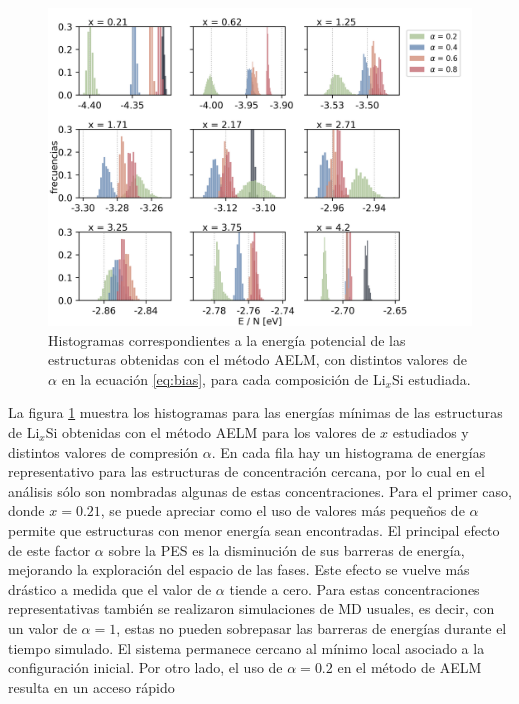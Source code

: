 \begin{figure}[th]
    \centering
    \includegraphics[width=\textwidth]{caracterizacion/resultados/introduccion/energias.png}
    \caption{Histogramas correspondientes a la energía potencial de las 
    estructuras obtenidas con el método AELM, con distintos valores de $\alpha$
    en la ecuación \ref{eq:bias}, para cada composición de Li$_x$Si estudiada.}
    \label{fig:energias}
\end{figure}
La figura \ref{fig:energias} muestra los histogramas para las energías mínimas
de las estructuras de Li$_x$Si obtenidas con el método AELM para los valores de
$x$ estudiados y distintos valores de compresión $\alpha$. En cada fila hay un 
histograma de energías representativo para las estructuras de concentración 
cercana, por lo cual en el análisis sólo son nombradas algunas de estas 
concentraciones. Para el primer caso, donde $x = 0.21$, se puede apreciar como el 
uso de valores más pequeños de $\alpha$ permite que estructuras con menor energía 
sean encontradas. El principal efecto de este factor $\alpha$ sobre la PES es la 
disminución de sus barreras de energía, mejorando la exploración del espacio de 
las fases. Este efecto se vuelve más drástico a medida que el valor de $\alpha$ 
tiende a cero. Para estas concentraciones representativas también se realizaron 
simulaciones de MD usuales, es decir, con un valor de $\alpha = 1$, estas no 
pueden sobrepasar las barreras de energías durante el tiempo simulado. El sistema 
permanece cercano al mínimo local asociado a la configuración inicial. Por otro 
lado, el uso de $\alpha = 0.2$ en el método de AELM resulta en un acceso rápido
